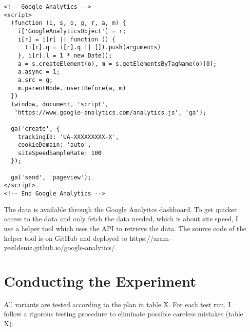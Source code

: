 

\begin{center}
\begin{lstlisting}[caption={The Google Analyitcs Tracking Script}, label={listing:ga_script}, numbers=none]
<!-- Google Analytics -->
<script>
  (function (i, s, o, g, r, a, m) {
    i['GoogleAnalyticsObject'] = r;
    i[r] = i[r] || function () {
      (i[r].q = i[r].q || []).push(arguments)
    }, i[r].l = 1 * new Date();
    a = s.createElement(o), m = s.getElementsByTagName(o)[0];
    a.async = 1;
    a.src = g;
    m.parentNode.insertBefore(a, m)
  })
  (window, document, 'script',
   'https://www.google-analytics.com/analytics.js', 'ga');

  ga('create', {
    trackingId: 'UA-XXXXXXXXX-X',
    cookieDomain: 'auto',
    siteSpeedSampleRate: 100
  });
  
  ga('send', 'pageview');
</script>
<!-- End Google Analytics -->
\end{lstlisting}
\end{center}



The data is available through the Google Analyitcs dashboard.
To get quicker access to the data and only fetch the data needed, which is about site speed, I use a helper tool which uses the API to retrieve the data.
The source code of the helper tool is on GitHub and deployed to https://aram-yesildeniz.github.io/google-analytics/.



\section{Conducting the Experiment}

All variants are tested according to the plan in table X.
For each test run, I follow a rigorous testing procedure to eliminate possible careless mistakes (table X).

